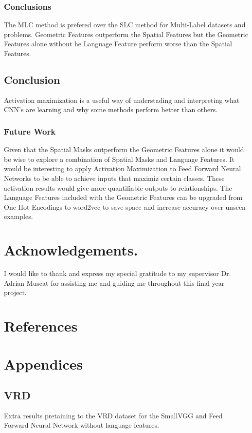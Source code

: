 \documentclass{csfyp}
\begin{document}
\subsubsection{Conclusions}
The MLC method is prefered over the SLC method for Multi-Label datasets and problems. Geometric Features outperform the Spatial Features but the Geometric Features alone without he Language Feature perform worse than the Spatial Features.

\subsection{Conclusion}
Activation maximization is a useful way of understading and interpreting what CNN's are learning and why some methods perform better than others.

\subsubsection{Future Work}
Given that the Spatial Masks outperform the Geometric Features alone it would be wise to explore a combination of Spatial Masks and Language Features. It would be interesting to apply Activation Maximization to Feed Forward Neural Networks to be able to achieve inputs that maximiz certain classes. These activation results would give more quantifiable outputs to relationships. The Language Features included with the Geometric Features can be upgraded from One Hot Encodings to word2vec to save space and increase accuracy over unseen examples. 
\newpage
\section*{Acknowledgements.}
I would like to thank and express my special gratitude to my supervisor Dr. Adrian Muscat for assisting me and guiding me throughout this final year project.

\section{References}
{}


\newpage
\section{Appendices}
\subsection{VRD}
Extra results pretaining to the VRD dataset for the SmallVGG and Feed Forward Neural Network without language features.
\end{document}

